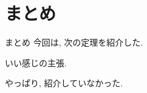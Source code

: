 \documentclass[../main]{subfiles}
\begin{document}
\section*{まとめ}
\begin{frame}{まとめ}{}
  今回は, 次の定理を紹介した.
  \begin{thm}[定理の名前]
    いい感じの主張.
  \end{thm}

  \vspace{1em}
  やっぱり, 紹介していなかった.
\end{frame}
\end{document}
